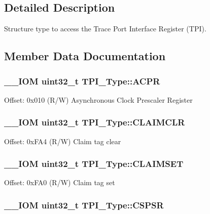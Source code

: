 \subsection{Detailed Description}
Structure type to access the Trace Port Interface Register (T\-P\-I). 

\subsection{Member Data Documentation}
\hypertarget{struct_t_p_i___type_a9e5e4421ef9c3d5b7ff8b24abd4e99b3}{
\subsubsection[{A\-C\-P\-R}]{\setlength{\rightskip}{0pt plus 5cm}\-\_\-\-\_\-\-I\-O\-M uint32\-\_\-t T\-P\-I\-\_\-\-Type\-::\-A\-C\-P\-R}}\label{struct_t_p_i___type_a9e5e4421ef9c3d5b7ff8b24abd4e99b3}
Offset\-: 0x010 (R/\-W) Asynchronous Clock Prescaler Register \hypertarget{struct_t_p_i___type_a0e10e292cb019a832b03ddd055b2f6ac}{
\subsubsection[{C\-L\-A\-I\-M\-C\-L\-R}]{\setlength{\rightskip}{0pt plus 5cm}\-\_\-\-\_\-\-I\-O\-M uint32\-\_\-t T\-P\-I\-\_\-\-Type\-::\-C\-L\-A\-I\-M\-C\-L\-R}}\label{struct_t_p_i___type_a0e10e292cb019a832b03ddd055b2f6ac}
Offset\-: 0x\-F\-A4 (R/\-W) Claim tag clear \hypertarget{struct_t_p_i___type_af8b7d15fa5252b733dd4b11fa1b5730a}{
\subsubsection[{C\-L\-A\-I\-M\-S\-E\-T}]{\setlength{\rightskip}{0pt plus 5cm}\-\_\-\-\_\-\-I\-O\-M uint32\-\_\-t T\-P\-I\-\_\-\-Type\-::\-C\-L\-A\-I\-M\-S\-E\-T}}\label{struct_t_p_i___type_af8b7d15fa5252b733dd4b11fa1b5730a}
Offset\-: 0x\-F\-A0 (R/\-W) Claim tag set \hypertarget{struct_t_p_i___type_a8826aa84e5806053395a742d38d59d0f}{
\subsubsection[{C\-S\-P\-S\-R}]{\setlength{\rightskip}{0pt plus 5cm}\-\_\-\-\_\-\-I\-O\-M uint32\-\_\-t T\-P\-I\-\_\-\-Type\-::\-C\-S\-P\-S\-R}}\label{struct_t_p_i___type_a8826aa84e5806053395a742d38d59d0f}
